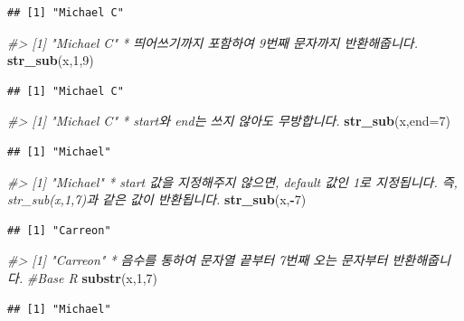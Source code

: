 \documentclass[10pt,]{krantz}
\makeatletter
\newenvironment{Shaded}{\begin{snugshade}}{\end{snugshade}}
\newcommand{\KeywordTok}[1]{\textcolor[rgb]{0.13,0.29,0.53}{\textbf{#1}}}
\newcommand{\DataTypeTok}[1]{\textcolor[rgb]{0.13,0.29,0.53}{#1}}
\newcommand{\DecValTok}[1]{\textcolor[rgb]{0.00,0.00,0.81}{#1}}
\newcommand{\CommentTok}[1]{\textcolor[rgb]{0.56,0.35,0.01}{\textit{#1}}}
\newcommand{\OperatorTok}[1]{\textcolor[rgb]{0.81,0.36,0.00}{\textbf{#1}}}
\newcommand{\NormalTok}[1]{#1}
\newenvironment{kframe}{%
\medskip{}
\setlength{\fboxsep}{.8em}
 \def\at@end@of@kframe{}%
 \ifinner\ifhmode%
  \def\at@end@of@kframe{\end{minipage}}%
  \begin{minipage}{\columnwidth}%
 \fi\fi%
 \def\FrameCommand##1{\hskip\@totalleftmargin \hskip-\fboxsep
 \colorbox{shadecolor}{##1}\hskip-\fboxsep
     \hskip-\linewidth \hskip-\@totalleftmargin \hskip\columnwidth}%
 \MakeFramed {\advance\hsize-\width
   \@totalleftmargin\z@ \linewidth\hsize
   \@setminipage}}%
 {\par\unskip\endMakeFramed%
 \at@end@of@kframe}
\renewenvironment{Shaded}{\begin{kframe}}{\end{kframe}}
\makeatother
\begin{document}
\begin{verbatim}
## [1] "Michael C"
\end{verbatim}

\begin{Shaded}
\begin{Highlighting}[]
\CommentTok{#> [1] "Michael C" * 띄어쓰기까지 포함하여 9번째 문자까지 반환해줍니다.}
\KeywordTok{str_sub}\NormalTok{(x,}\DecValTok{1}\NormalTok{,}\DecValTok{9}\NormalTok{)}
\end{Highlighting}
\end{Shaded}

\begin{verbatim}
## [1] "Michael C"
\end{verbatim}

\begin{Shaded}
\begin{Highlighting}[]
\CommentTok{#> [1] "Michael C" * start와 end는 쓰지 않아도 무방합니다.}
\KeywordTok{str_sub}\NormalTok{(x,}\DataTypeTok{end=}\DecValTok{7}\NormalTok{)}
\end{Highlighting}
\end{Shaded}

\begin{verbatim}
## [1] "Michael"
\end{verbatim}

\begin{Shaded}
\begin{Highlighting}[]
\CommentTok{#> [1] "Michael" * start 값을 지정해주지 않으면, default 값인 1로 지정됩니다. 즉, str_sub(x,1,7)과 같은 값이 반환됩니다.}
\KeywordTok{str_sub}\NormalTok{(x,}\OperatorTok{-}\DecValTok{7}\NormalTok{)}
\end{Highlighting}
\end{Shaded}

\begin{verbatim}
## [1] "Carreon"
\end{verbatim}

\begin{Shaded}
\begin{Highlighting}[]
\CommentTok{#> [1] "Carreon" * 음수를 통하여 문자열 끝부터 7번째 오는 문자부터 반환해줍니다.}
\CommentTok{#Base R}
\KeywordTok{substr}\NormalTok{(x,}\DecValTok{1}\NormalTok{,}\DecValTok{7}\NormalTok{)}
\end{Highlighting}
\end{Shaded}

\begin{verbatim}
## [1] "Michael"
\end{verbatim}
\end{document}
